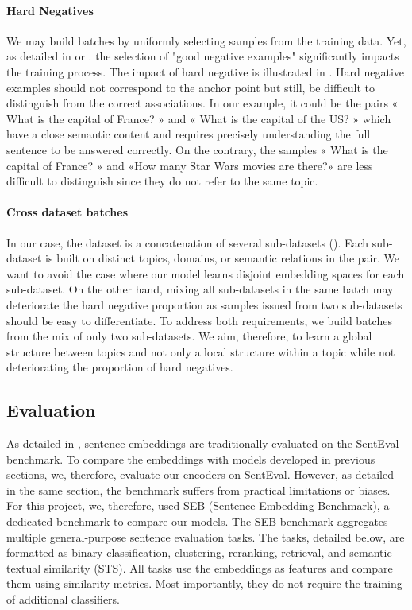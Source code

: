 \paragraph{Hard Negatives} We may build batches by uniformly selecting samples from the training data. Yet, as detailed in \textcite{robinson_21} or \textcite{qu_21}. the selection of "good negative examples" significantly impacts the training process. The impact of hard negative is illustrated in .
Hard negative examples should not correspond to the anchor point but still, be difficult to distinguish from the correct associations. 
In our example, it could be the pairs « What is the capital of France? » and « What is the capital of the US? » which have a close semantic content and requires precisely understanding the full sentence to be answered correctly. On the contrary, the samples « What is the capital of France? » and «How many Star Wars movies are there?» are less difficult to distinguish since they do not refer to the same topic.

\paragraph{Cross dataset batches} In our case, the dataset is a concatenation of several sub-datasets (). Each sub-dataset is built on distinct topics, domains, or semantic relations in the pair. We want to avoid the case where our model learns disjoint embedding spaces for each sub-dataset. On the other hand, mixing all sub-datasets in the same batch may deteriorate the hard negative proportion as samples issued from two sub-datasets should be easy to differentiate. To address both requirements, we build batches from the mix of only two sub-datasets. We aim, therefore, to learn a global structure between topics and not only a local structure within a topic while not deteriorating the proportion of hard negatives.

\subsection{Evaluation}

As detailed in , sentence embeddings are traditionally evaluated on the SentEval benchmark. To compare the embeddings with models developed in previous sections, we, therefore, evaluate our encoders on SentEval. However, as detailed in the same section, the benchmark suffers from practical limitations or biases. For this project, we, therefore, used SEB (Sentence Embedding Benchmark), a dedicated benchmark to compare our models. The SEB benchmark aggregates multiple general-purpose sentence evaluation tasks. The tasks, detailed below, are formatted as binary classification, clustering, reranking, retrieval, and semantic textual similarity (STS). All tasks use the embeddings as features and compare them using similarity metrics. Most importantly, they do not require the training of additional classifiers.

